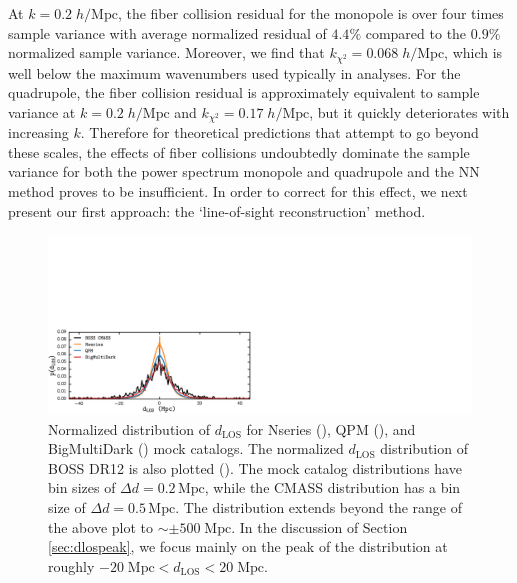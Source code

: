 At $k = 0.2\;h/\mathrm{Mpc}$, the fiber collision residual for 
the monopole is over four times sample variance with average normalized 
residual of $4.4\%$ compared to the $0.9\%$ normalized sample variance. 
Moreover, we find that $k_{\chi^2} = 0.068\;h/\mathrm{Mpc}$, which is well below the maximum wavenumbers used typically in analyses. 
For the quadrupole, the fiber collision residual is approximately equivalent to 
sample variance at $k = 0.2\;h/\mathrm{Mpc}$ and $k_{\chi^2} = 0.17\;h/\mathrm{Mpc}$, but it quickly deteriorates with increasing $k$. 
Therefore for theoretical predictions that attempt to go beyond these scales, the effects of 
fiber collisions undoubtedly dominate the sample variance for both the power 
spectrum monopole and quadrupole and the NN method proves to be insufficient. In order to 
correct for this effect,  we next present our first approach: the `line-of-sight 
reconstruction' method.
\begin{figure}
\begin{center}
\includegraphics[scale=0.575]{figs/fc/mock_catalog_dlos.pdf}
\caption{
Normalized distribution of $d_{\mathrm{LOS}}$ for Nseries
(\nseriescolor), QPM (\qpmcolor), and BigMultiDark (\tmcolor) 
mock catalogs. The normalized $d_{\mathrm{LOS}}$ distribution of 
BOSS DR12 is also plotted (\cmasscolor). The mock catalog distributions 
have bin sizes of $\Delta d = 0.2\, \mathrm{Mpc}$, while the CMASS distribution has
a bin size of $\Delta d = 0.5\, \mathrm{Mpc}$. The distribution extends beyond 
the range of the above plot to $\sim \pm 500 \; \mathrm{Mpc}$. 
In the discussion of Section \ref{sec:dlospeak}, we focus mainly 
on the peak of the distribution at roughly
$-20 \; \mathrm{Mpc} < d_\mathrm{LOS} < 20 \;\mathrm{Mpc}$.} 
\label{fig:d_los}
\end{center}
\end{figure}
